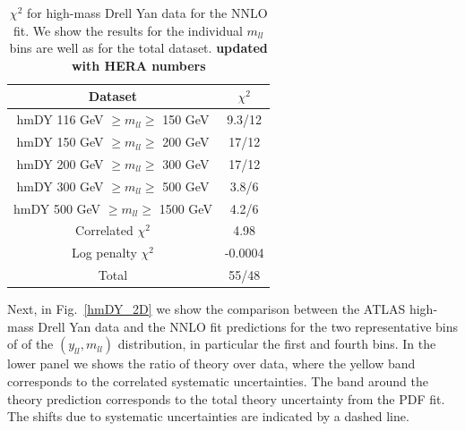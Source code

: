 \begin{table}[t]
  \centering
  \begin{tabular}{|c|c|}
    \hline
    Dataset  &   $\chi^2$ \\
    \hline
    \hline
    hmDY  116 GeV $\ge m_{ll} \ge $ 150 GeV  &  9.3/12 \\
    hmDY  150 GeV $\ge m_{ll} \ge $ 200 GeV  &  17/12 \\
    hmDY  200 GeV $\ge m_{ll} \ge $ 300 GeV  &  17/12 \\
    hmDY  300 GeV $\ge m_{ll} \ge $ 500 GeV  &  3.8/6 \\
    hmDY  500 GeV $\ge m_{ll} \ge $ 1500 GeV  &  4.2/6 \\
    \hline
    Correlated $\chi^2$ & 4.98 \\
    Log penalty $\chi^2$  & -0.0004 \\
    \hline
    \hline
    Total  & 55/48 \\
    \hline
    \end{tabular}
  \caption{$\chi^{2}$ for high-mass Drell Yan data for the NNLO fit.
    We show the results for the individual $m_{ll}$ bins
    are well as for the total dataset. {\bf updated
    with HERA numbers}
\label{tab:chi2fit}
  }
\end{table}

Next, in Fig.~\ref{hmDY_2D} we show the
comparison between the ATLAS high-mass Drell Yan data and the NNLO fit predictions
for the  two representative bins of of the $(y_{ll},m_{ll})$ distribution,
  in particular the first and fourth bins.
%
In the lower panel we shows the ratio of theory over data, where the yellow band
corresponds to the correlated systematic uncertainties.
%
The band around the theory prediction corresponds to the total
theory uncertainty from the PDF fit.
%
The shifts due to systematic uncertainties are indicated by a dashed line.


